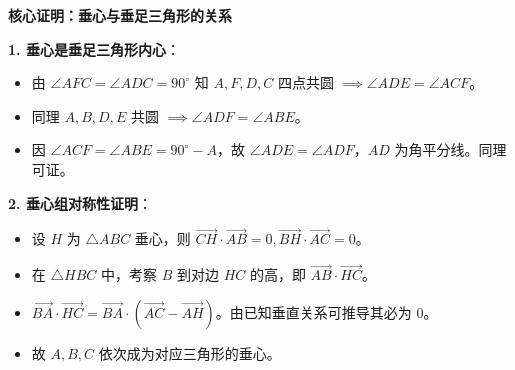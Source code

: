 \begin{proofbox}
\textbf{核心证明：垂心与垂足三角形的关系}

\textbf{1. 垂心是垂足三角形内心}：
\begin{itemize}
    \item 由 $\angle AFC = \angle ADC = 90^\circ$ 知 $A, F, D, C$ 四点共圆 $\implies \angle ADE = \angle ACF$。
    \item 同理 $A, B, D, E$ 共圆 $\implies \angle ADF = \angle ABE$。
    \item 因 $\angle ACF = \angle ABE = 90^\circ - A$，故 $\angle ADE = \angle ADF$，$AD$ 为角平分线。同理可证。
\end{itemize}

\textbf{2. 垂心组对称性证明}：
\begin{itemize}
    \item 设 $H$ 为 $\triangle ABC$ 垂心，则 $\vec{CH} \cdot \vec{AB} = 0, \vec{BH} \cdot \vec{AC} = 0$。
    \item 在 $\triangle HBC$ 中，考察 $B$ 到对边 $HC$ 的高，即 $\vec{AB} \cdot \vec{HC}$。
    \item $\vec{BA} \cdot \vec{HC} = \vec{BA} \cdot (\vec{AC} - \vec{AH})$。由已知垂直关系可推导其必为 $0$。
    \item 故 $A, B, C$ 依次成为对应三角形的垂心。
\end{itemize}
\end{proofbox}